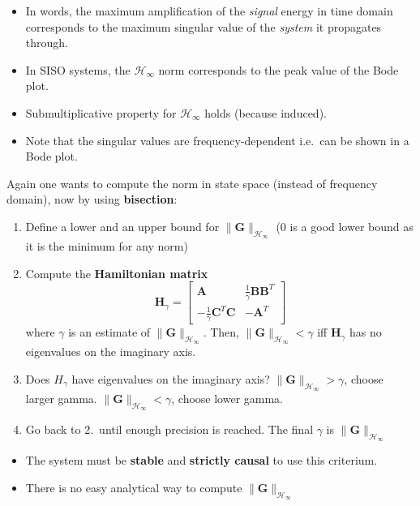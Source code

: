 \newpar{}

\begin{itemize}
    \item In words, the maximum amplification of the \textit{signal} energy in time domain corresponds to the maximum singular value of the \textit{system} it propagates through.   %
    \item In SISO systems, the $\mathcal{H}_\infty$ norm corresponds to the peak value of the Bode plot.
    \item Submultiplicative property for $\mathcal{H}_\infty$ holds (because induced).
    \item Note that the singular values are frequency-dependent i.e.\ can be shown in a Bode plot.
\end{itemize}

\newpar{}

Again one wants to compute the norm in state space (instead of frequency domain), now by using \textbf{bisection}:
\begin{enumerate}
    \item Define a lower and an upper bound for $\|\mathbf{G}\|_{\mathcal{H}_{\infty}}$ (0 is a good lower bound as it is the minimum for any norm)
    \item Compute the \textbf{Hamiltonian matrix}
          \begin{equation*}
              \mathbf{H}_{\gamma}=
              \begin{bmatrix}
                  \mathbf{A}                                & \frac{1}{\gamma}\mathbf{BB}^{T} \\
                  -\frac{1}{\gamma}\mathbf{C}^{T}\mathbf{C} & -\mathbf{A}^{T}
              \end{bmatrix}
          \end{equation*}
          where $\gamma$ is an estimate of $\|\mathbf{G}\|_{\mathcal{H}_{\infty}}$. Then, $\|\mathbf{G}\|_{\mathcal{H}_{\infty}}<\gamma$ iff $\mathbf{H}_{\gamma}$ has no eigenvalues on the imaginary axis.
    \item Does $H_{\gamma}$ have eigenvalues on the imaginary axis?
           $\|\mathbf{G}\|_{\mathcal{H}_{\infty}}>\gamma$, choose larger gamma.
           $\|\mathbf{G}\|_{\mathcal{H}_{\infty}}<\gamma$, choose lower gamma.
    \item Go back to 2.\ until enough precision is reached. The final $\gamma$ is $\|\mathbf{G}\|_{\mathcal{H}_{\infty}}$
\end{enumerate}


\begin{itemize}
    \item The system must be \textbf{stable} and \textbf{strictly causal} to use this criterium.
    \item There is no easy analytical way to compute $\|\mathbf{G}\|_{\mathcal{H}_{\infty}}$
\end{itemize}